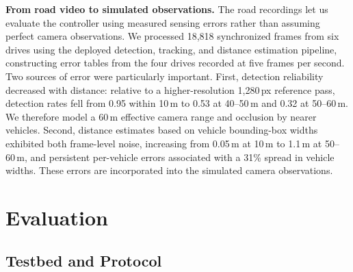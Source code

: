 \documentclass[letterpaper, 10pt, journal, twoside]{IEEEtran}
\begin{document}
\noindent\textbf{From road video to simulated observations.} The road recordings let us evaluate the controller using measured sensing errors rather than assuming perfect camera observations. We processed 18,818 synchronized frames from six drives using the deployed detection, tracking, and distance estimation pipeline, constructing error tables from the four drives recorded at five frames per second. Two sources of error were particularly important. First, detection reliability decreased with distance: relative to a higher-resolution 1,280\,px reference pass, detection rates fell from 0.95 within 10\,m to 0.53 at 40--50\,m and 0.32 at 50--60\,m. We therefore model a 60\,m effective camera range and occlusion by nearer vehicles. Second, distance estimates based on vehicle bounding-box widths exhibited both frame-level noise, increasing from 0.05\,m at 10\,m to 1.1\,m at 50--60\,m, and persistent per-vehicle errors associated with a 31\% spread in vehicle widths. These errors are incorporated into the simulated camera observations. 


\section{Evaluation}

\label{sec:eval}

\subsection{Testbed and Protocol}

\label{sec:sim}
\end{document}
